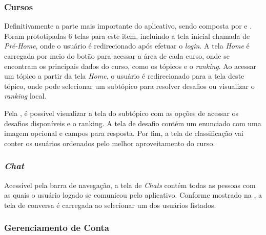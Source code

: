 \subsubsection{Cursos}

Definitivamente a parte mais importante do aplicativo, sendo composta por  e . Foram prototipadas 6 telas para este item, incluindo a tela inicial chamada de \textit{Pré-Home}, onde o usuário é redirecionado após efetuar o \textit{login}. A tela \textit{Home} é carregada por meio do botão para acessar a área de cada curso, onde se encontram os principais dados do curso, como os tópicos e o \textit{ranking}. Ao acessar um tópico a partir da tela \textit{Home}, o usuário é redirecionado para a tela deste tópico, onde pode selecionar um subtópico para resolver desafios ou visualizar o \textit{ranking} local.


Pela , é possível visualizar a tela do subtópico com as opções de acessar os desafios disponíveis e o ranking. A tela de desafio contém um enunciado com uma imagem opcional e campos para resposta. Por fim, a tela de classificação vai conter os usuários ordenados pelo melhor aproveitamento do curso.


\subsubsection{\textit{Chat}}

Acessível pela barra de navegação, a tela de \textit{Chats} contém todas as pessoas com as quais o usuário logado se comunicou pelo aplicativo. Conforme mostrado na , a tela de conversa é carregada ao selecionar um dos usuários listados.


\subsubsection{Gerenciamento de Conta}

